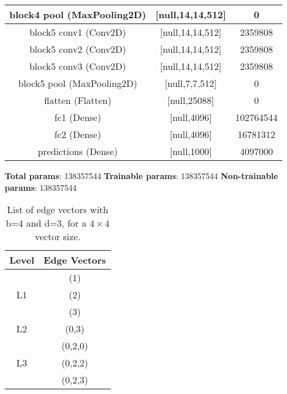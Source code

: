 \begin{table}[!t]
\begin{tabular}{|c|c|c|}
    block4 pool (MaxPooling2D) & [null,14,14,512] & 0 \\
    \hline
    
    block5 conv1 (Conv2D) & [null,14,14,512] & 2359808 \\
    \hline
    
    block5 conv2 (Conv2D) & [null,14,14,512] & 2359808 \\
    \hline
    
    block5 conv3 (Conv2D) & [null,14,14,512] & 2359808 \\
    \hline
    
    block5 pool (MaxPooling2D) & [null,7,7,512] & 0 \\
    \hline
    
    flatten (Flatten) & [null,25088] & 0 \\
    \hline
    
    fc1 (Dense) & [null,4096] & 102764544 \\
    \hline
    
    fc2 (Dense) & [null,4096] & 16781312 \\
    \hline
    
    predictions (Dense) & [null,1000] & 4097000 \\
    \hline

  \end{tabular}

\end{table}

\linebreak
\textbf{Total params}: 138357544 \newline
\textbf{Trainable params}: 138357544 \newline
\textbf{Non-trainable params}: 138357544 \newline

\begin{table}[!t]
  \renewcommand{\arraystretch}{1.3}
  \centering

  \caption{List of edge vectors with b=4 and d=3, for a
    $4 \times 4$ vector size.}
  \label{table2}

  \begin{tabular}{|c|c|} \hline
    Level & Edge Vectors \\ \hline

    & (1)\\
    L1 & (2)\\
    & (3) \\ \hline

    L2 & (0,3) \\ \hline

    & (0,2,0)\\
    L3 & (0,2,2)\\
    & (0,2,3) \\ \hline

  \end{tabular}

\end{table}





